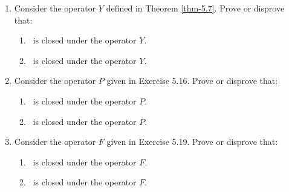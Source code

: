 \begin{enumerate}[{10.}1.]
\item Consider the operator $Y$ defined in Theorem \ref{thm-5.7}. Prove or disprove that:
\begin{enumerate}
\item \PSIG\ is closed under the operator $Y$.
\item \ASIG\ is closed under the operator $Y$.
\end{enumerate}

\item Consider the operator $P$ given in Exercise 5.16. Prove or disprove that:
\begin{enumerate}
\item \PSIG\ is closed under the operator $P$.
\item \ASIG\ is closed under the operator $P$.
\end{enumerate}

\item Consider the operator $F$ given in Exercise 5.19. Prove or disprove that:
\begin{enumerate}
\item \PSIG\ is closed under the operator $F$.
\item \ASIG\ is closed under the operator $F$.
\end{enumerate}
\end{enumerate}
